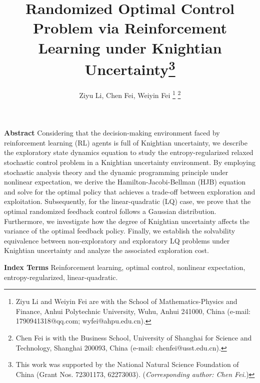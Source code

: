 \documentclass[onecolumn, journal]{IEEEtran} %
\begin{document}
	\thispagestyle{firstpage}
	\title{Randomized Optimal Control Problem via Reinforcement Learning under Knightian Uncertainty\thanks{This work was supported by the National Natural Science Foundation of China (Grant Nos. 72301173, 62273003). (\textit{Corresponding author: Chen Fei.})}}
	\author{
		Ziyu Li, 
		Chen Fei, 
		Weiyin Fei
		\thanks{Ziyu Li and Weiyin Fei are with the School of Mathematics-Physics and Finance, Anhui Polytechnic University, Wuhu, Anhui 241000, China (e-mail: 1790941318@qq.com; wyfei@ahpu.edu.cn).}
		\thanks{Chen Fei is with the Business School, University of Shanghai for Science and Technology, Shanghai 200093, China (e-mail: chenfei@usst.edu.cn).}
	}
	
	\maketitle %
	
	\indent\textbf{Abstract} %
		Considering that the decision-making environment faced by reinforcement learning (RL) agents is full of Knightian uncertainty, we describe the exploratory state dynamics equation to study the entropy-regularized relaxed stochastic control problem in a Knightian uncertainty environment. By employing stochastic analysis theory and the dynamic programming principle under nonlinear expectation, we derive the Hamilton-Jacobi-Bellman (HJB) equation and solve for the optimal policy that achieves a trade-off between exploration and exploitation. Subsequently, for the linear-quadratic (LQ) case, we prove that the optimal randomized feedback control follows a Gaussian distribution. Furthermore, we investigate how the degree of Knightian uncertainty affects the variance of the optimal feedback policy. Finally, we establish the solvability equivalence between non-exploratory and exploratory LQ problems under Knightian uncertainty and analyze the associated exploration cost.
	
	
\indent\textbf{Index  Terms}
		Reinforcement learning, optimal control, nonlinear expectation, entropy-regularized, linear-quadratic.

	
\end{document}
